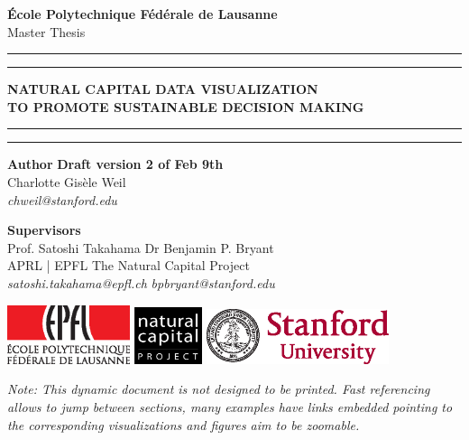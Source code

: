 
\begin{titlingpage}
\begin{center}
\Large
\textbf{École Polytechnique Fédérale de Lausanne} \\
\vspace{1cm}
Master Thesis
\vspace{2cm}
\hrule
\vspace{0.1cm}
\hrule
\vspace{1cm}
\Huge
\textbf{NATURAL CAPITAL DATA VISUALIZATION } \\
\huge
\textbf{TO PROMOTE SUSTAINABLE DECISION MAKING} \\

\Large
\vspace{0.2cm}

\vspace{1cm}
\hrule
\vspace{0.1cm}
\hrule

\end{center}
\vfill
\noindent \textbf{Author} \hfill \textbf{Draft version 2 of Feb 9th} \\
Charlotte Gisèle Weil \\
\textit{chweil@stanford.edu} \\
\vspace{0.5cm}

\noindent \textbf{Supervisors} \\
Prof. Satoshi Takahama          \hfill    Dr Benjamin P. Bryant \\
APRL | EPFL      \hfill    The Natural Capital Project\\
\textit{satoshi.takahama@epfl.ch} \hfill    \textit{bpbryant@stanford.edu} \\
\vspace{0.8cm}

\noindent \includegraphics[width=0.27\textwidth]{images/epfl-logo.eps}
\hfill  \hfill \hfill  \includegraphics[width=0.15\textwidth]{images/natcap-logo.eps} \hfill  \hfill 
\includegraphics[width=0.4\textwidth]{images/stanford-logo.eps}

\newpage
\vspace{\fill}
\textit{Note: This dynamic document is not designed to be printed. Fast referencing allows to jump between sections, many examples have links embedded pointing to the corresponding visualizations and figures aim to be zoomable.}

\end{titlingpage}

